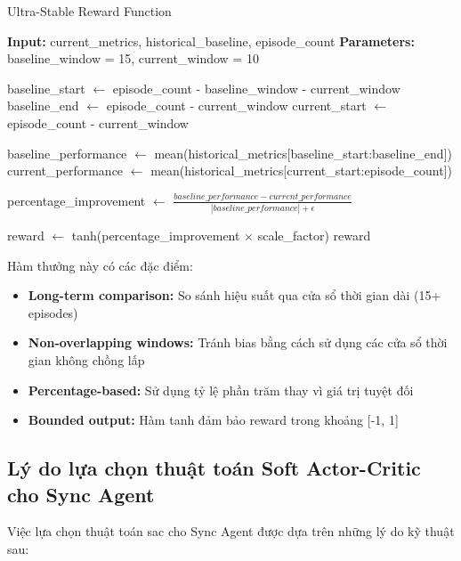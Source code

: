 \begin{algorithm}[!htp]
    \caption{Ultra-Stable Reward Function}
    \begin{algorithmic}[1]
        \State \textbf{Input:} current\_metrics, historical\_baseline, episode\_count 
        \State \textbf{Parameters:} baseline\_window = 15, current\_window = 10 
             
        \EndIf
        
        \State baseline\_start $\leftarrow$ episode\_count - baseline\_window - current\_window
        \State baseline\_end $\leftarrow$ episode\_count - current\_window
        \State current\_start $\leftarrow$ episode\_count - current\_window
        
        \State baseline\_performance $\leftarrow$ mean(historical\_metrics[baseline\_start:baseline\_end])
        \State current\_performance $\leftarrow$ mean(historical\_metrics[current\_start:episode\_count])
        
        \State percentage\_improvement $\leftarrow$ $\frac{baseline\_performance - current\_performance}{|baseline\_performance| + \epsilon}$
        
        \State reward $\leftarrow$ tanh(percentage\_improvement $\times$ scale\_factor)
        \Return reward
    \end{algorithmic}
\end{algorithm}

Hàm thưởng này có các đặc điểm:
\begin{itemize}
    \item \textbf{Long-term comparison:} So sánh hiệu suất qua cửa sổ thời gian
        dài (15+ episodes)

    \item \textbf{Non-overlapping windows:} Tránh bias bằng cách sử dụng các cửa
        sổ thời gian không chồng lấp

    \item \textbf{Percentage-based:} Sử dụng tỷ lệ phần trăm thay vì giá trị
        tuyệt đối

    \item \textbf{Bounded output:} Hàm tanh đảm bảo reward trong khoảng [-1, 1]
\end{itemize}

\subsection{Lý do lựa chọn thuật toán Soft Actor-Critic cho Sync Agent}
Việc lựa chọn thuật toán \ac{sac} cho Sync Agent được dựa trên những lý do kỹ thuật sau:

